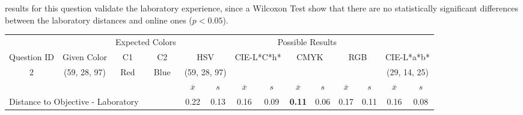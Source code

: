results for this question validate the laboratory experience, since a Wilcoxon Test show that there are no statistically significant differences
between the laboratory distances and online ones ($p < 0.05$).
%
\begin{table}[H]
  \resizebox{\textwidth}{!} {
  \begin{tabular}{lccccccccccccc}
    \hline
    \multicolumn{1}{c}{}                              &                                      & \multicolumn{2}{c}{Expected Colors}                   & \multicolumn{10}{c}{Possible Results}                                                                                                                                                                                                                                                                                        \\ \cline{3-14}
    \multicolumn{1}{c}{\multirow{-2}{*}{Question ID}} & \multirow{-2}{*}{Given Color}        & C1                       & C2                         & \multicolumn{2}{c}{HSV}                                        & \multicolumn{2}{c}{CIE-L*C*h*}                                 & \multicolumn{2}{c}{CMYK}                                       & \multicolumn{2}{c}{RGB}                                        & \multicolumn{2}{c}{CIE-L*a*b*}                                 \\ \hline
    \multicolumn{1}{c}{2}                             & \cellcolor[HTML]{FF00FF}(59, 28, 97) & \multicolumn{1}{c|}{Red} & \multicolumn{1}{c|}{Blue}  & \multicolumn{2}{c|}{\cellcolor[HTML]{FF00FF}(59, 28, 97)}      & \multicolumn{2}{c|}{\cellcolor[HTML]{FB0080}{\color[HTML]{FFFFFF}(44, 22, 22)}}       & \multicolumn{2}{c|}{\cellcolor[HTML]{800080}{\color[HTML]{FFFFFF}(13, 6, 21)}}       & \multicolumn{2}{c|}{\cellcolor[HTML]{800080}{\color[HTML]{FFFFFF}(13, 6, 21)}}       & \multicolumn{2}{c|}{\cellcolor[HTML]{CA0088}(29, 14, 25)}       \\ \hline
                                                      & \multicolumn{1}{l}{}                 & \multicolumn{1}{l}{}     & \multicolumn{1}{l}{}       & \multicolumn{1}{c}{$\overline{x}$} & \multicolumn{1}{c}{$s$} & \multicolumn{1}{c}{$\overline{x}$} & \multicolumn{1}{c}{$s$} & \multicolumn{1}{c}{$\overline{x}$} & \multicolumn{1}{c}{$s$} & \multicolumn{1}{c}{$\overline{x}$} & \multicolumn{1}{c}{$s$} & \multicolumn{1}{c}{$\overline{x}$} & \multicolumn{1}{c}{$s$} \\ \hline
    \multicolumn{4}{l}{Distance to Objective - Laboratory}                                                                                           & \multicolumn{1}{|c}{0.22}       & \multicolumn{1}{c|}{0.13}    & \multicolumn{1}{|c}{0.16}       & \multicolumn{1}{c|}{0.09}    & \multicolumn{1}{|c}{\textbf{0.11}}       & \multicolumn{1}{c|}{0.06}    & \multicolumn{1}{|c}{0.17}       & \multicolumn{1}{c|}{0.11}    & \multicolumn{1}{|c}{0.16}       & \multicolumn{1}{c|}{0.08}    \\

\end{tabular}}
\end{table}
